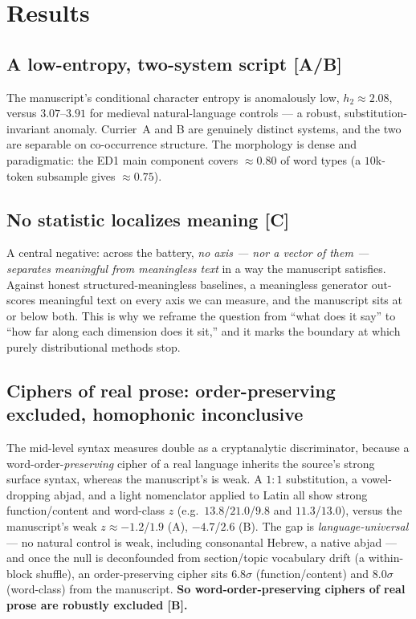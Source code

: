 \documentclass[11pt]{article}
\newcommand{\grade}[1]{{\small\textbf{[#1]}}}
\begin{document}
\section{Results}
\subsection{A low-entropy, two-system script \grade{A/B}}
The manuscript's conditional character entropy is anomalously low, $h_2\approx 2.08$, versus
$3.07$--$3.91$ for medieval natural-language controls --- a robust, substitution-invariant
anomaly. Currier~A and B are genuinely distinct systems, and the two are separable on
co-occurrence structure. The morphology is dense and paradigmatic: the ED1 main component
covers $\approx 0.80$ of word types (a $10$k-token subsample gives $\approx 0.75$).

\subsection{No statistic localizes meaning \grade{C}}
\label{sec:meaning}
A central negative: across the battery, \emph{no axis --- nor a vector of them --- separates
meaningful from meaningless text} in a way the manuscript satisfies. Against honest
structured-meaningless baselines, a meaningless generator out-scores meaningful text on every
axis we can measure, and the manuscript sits at or below both. This is why we reframe the
question from ``what does it say'' to ``how far along each dimension does it sit,'' and it marks
the boundary at which purely distributional methods stop.

\subsection{Ciphers of real prose: order-preserving excluded, homophonic inconclusive}
\label{sec:cipher}
The mid-level syntax measures double as a cryptanalytic discriminator, because a
word-order-\emph{preserving} cipher of a real language inherits the source's strong surface
syntax, whereas the manuscript's is weak. A $1{:}1$ substitution, a vowel-dropping abjad, and a
light nomenclator applied to Latin all show strong function/content and word-class $z$
(e.g.\ $13.8$/$21.0$/$9.8$ and $11.3$/$13.0$), versus the manuscript's weak
$z\approx-1.2$/$1.9$ (A), $-4.7$/$2.6$ (B). The gap is \emph{language-universal} --- no natural
control is weak, including consonantal Hebrew, a native abjad --- and once the null is
deconfounded from section/topic vocabulary drift (a within-block shuffle), an order-preserving
cipher sits $6.8\sigma$ (function/content) and $8.0\sigma$ (word-class) from the manuscript.
\textbf{So word-order-preserving ciphers of real prose are robustly excluded \grade{B}.}
\end{document}
